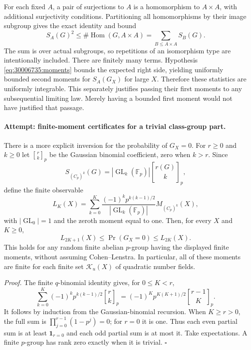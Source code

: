 \documentclass[11pt,a4paper]{article}
\newcommand{\F}{\mathbb{F}}
\numberwithin{equation}{section}
\begin{document}
For each fixed $A$, a pair of surjections to $A$ is a homomorphism to
$A\times A$, with additional surjectivity conditions. Partitioning all
homomorphisms by their image subgroup gives the exact identity and bound
\begin{equation}\label{eq:30006735:UI}
 S_A(G)^2\leq\#\operatorname{Hom}(G,A\times A)
 =\sum_{B\leq A\times A}S_B(G).
\end{equation}
The sum is over actual subgroups, so repetitions of an isomorphism type
are intentionally included. There are finitely many terms. Hypothesis
\eqref{eq:30006735:moments} bounds the expected right side, yielding uniformly
bounded second moments for $S_A(G_X)$ for large $X$. Therefore these
statistics are uniformly integrable. This separately justifies passing
their first moments to any subsequential limiting law. Merely having a
bounded first moment would not have justified that passage.

\paragraph{Attempt: finite-moment certificates for a trivial class-group part.}
There is a more explicit inversion for the probability of $G_X=0$.
For $r\geq0$ and $k\geq0$ let $\genfrac{[}{]}{0pt}{}{r}{k}_p$ be the Gaussian binomial
coefficient, zero when $k>r$. Since
\[
 S_{(C_p)^k}(G)=|\operatorname{GL}_k(\F_p)|\genfrac{[}{]}{0pt}{}{r(G)}{k}_p,
\]
define the finite observable
\[
 L_K(X)=\sum_{k=0}^K
 \frac{(-1)^k p^{k(k-1)/2}}{|\operatorname{GL}_k(\F_p)|}
 M_{(C_p)^k}(X),
\]
with $|\operatorname{GL}_0|=1$ and the zeroth moment equal to one.
Then, for every $X$ and $K\geq0$,
\begin{equation}\label{eq:30006735:bonferroni}
 L_{2K+1}(X)\leq\Pr(G_X=0)\leq L_{2K}(X).
\end{equation}
This holds for any random finite abelian $p$-group having the displayed
finite moments, without assuming Cohen--Lenstra. In particular, all of
these moments are finite for each finite set $\mathcal K_u(X)$ of quadratic number fields.

\emph{Proof.} The finite $q$-binomial identity gives, for $0\leq K<r$,
\[
 \sum_{k=0}^K(-1)^kp^{k(k-1)/2}\genfrac{[}{]}{0pt}{}{r}{k}_p
 =(-1)^Kp^{K(K+1)/2}\genfrac{[}{]}{0pt}{}{r-1}{K}_p.
\]
It follows by induction from the Gaussian-binomial recursion. When
$K\geq r>0$, the full sum is
$\prod_{j=0}^{r-1}(1-p^j)=0$; for $r=0$ it is one.
Thus each even partial sum is at least $\mathbf1_{r=0}$ and each odd
partial sum is at most it. Take expectations. A finite $p$-group has
rank zero exactly when it is trivial. $\square$
\end{document}
